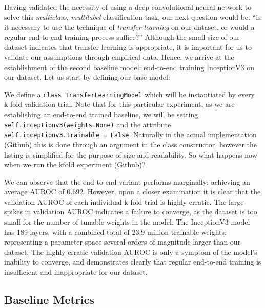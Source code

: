 Having validated the necessity of using a deep convolutional neural network to solve this \emph{multiclass}, \emph{multilabel} classification task, our next question would be: \enquote{is it necessary to use the technique of \emph{transfer-learning} on our dataset, or would a regular end-to-end training process suffice?} Although the small size of our dataset indicates that transfer learning is appropriate, it is important for us to validate our assumptions through empirical data. Hence, we arrive at the establishment of the second baseline model: end-to-end training InceptionV3 on our dataset. Let us start by defining our base model:



\noindent
We define a \texttt{class TransferLearningModel} which will be instantiated by every k-fold validation trial. Note that for this particular experiment, as we are establishing an end-to-end trained baseline, we will be setting \texttt{self.inceptionv3(weights=None)} and the attribute \texttt{self.inceptionv3.trainable = False}. Naturally in the actual implementation (\href{https://github.com/ShenZhouHong/radiography-ai-project/blob/cf8c9e9a1f07849787a98b2fc51df690354bf194/python/common/model.py}{Github}) this is done through an argument in the class constructor, however the listing is simplified for the purpose of size and readability. So what happens now when we run the kfold experiment (\href{https://github.com/ShenZhouHong/radiography-ai-project/blob/ef29e4cb63fc38185b3bb45fc37027df3e385a44/python/initial-evaluation/inceptionv3-end2end.ipynb}{Github})?



\noindent
We can observe that the end-to-end variant performs marginally: achieving an average AUROC of \(0.692\). However, upon a closer examination it is clear that the validation AUROC of each individual k-fold trial is highly erratic. The large spikes in validation AUROC indicates a failure to converge, as the dataset is too small for the number of tunable weights in the model. The InceptionV3 model has 189 layers, with a combined total of 23.9 million trainable weights: representing a parameter space several orders of magnitude larger than our dataset. The highly erratic validation AUROC is only a symptom of the model's inability to converge, and demonstrates clearly that regular end-to-end training is insufficient and inappropriate for our dataset.

\subsection{Baseline Metrics}

